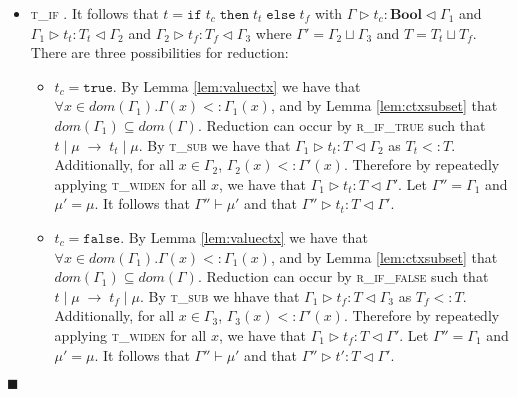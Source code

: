 \documentclass[preprint]{sigplanconf}
\newcommand{\lemref}[1]{Lemma \ref{#1}}
\newcommand{\rmethc}{\textsc{r\_meth\_call} }
\newcommand{\riftrue}{\textsc{r\_if\_true} }
\newcommand{\riffalse}{\textsc{r\_if\_false} }
\newcommand{\tif}{\textsc{t\_if} }
\newcommand{\tsub}{\textsc{t\_sub} }
\newcommand{\twiden}{\textsc{t\_widen} }
\newcommand{\typerule}[4]{#1 \triangleright #2 : #3 \triangleleft #4}
\newcommand{\oprule}[4]{#1 \mid #2\;\longrightarrow\;#3 \mid #4}
\newcommand{\truev}{\mathtt{true}}
\newcommand{\falsev}{\mathtt{false}}
\newcommand{\boolt}{\mathbf{Bool}}
\newcommand{\ift}[3]{\mathtt{if} \; #1 \; \mathtt{then} \; #2 \; \mathtt{else} \; #3}
\newcommand{\qed}{$\blacksquare$}
\newenvironment{proof}{\vspace{1ex}\noindent{\bf Proof}\hspace{0.5em}}
  {\hfill\qed\vspace{1ex}}
\begin{document}
\begin{proof}
\begin{itemize}
As
$\Gamma \vdash \mu$, we must have $\mu(x) = o'@S_c$ with
$\typerule{\emptyset}{o'@S_c}{O'@S_c}{\emptyset}$ such that
$O'@S_c <: O@\overline{S}$. 

We must have that
$o' = [ S_c \{ m = (v,S_n) ; ... \} ... ]$, where $O'@S_n <: O@\overline{S'}$. 
It follows that $\typerule{\emptyset}{v}{T'}{\emptyset}$
for some $T'$ such that $T' <: T$.

Therefore reduction can occur by \rmethc such that
$\oprule{t}{\mu}{v}{\mu [x \mapsto o@S_n]}$.
Let $\mu' = \mu [ x \mapsto o@S']$.

Let $\Gamma'' = \Gamma'$. By the appropriate value typing rule for $v$, 
it follows that $\typerule{\Gamma''}{v}{T'}{\Gamma'}$.
By application of rule \tsub, it follows that
$\typerule{\Gamma''}{v}{T}{\Gamma'}$.
Additionally, it follows that
$\Gamma'' \vdash \mu'$, as $O'@S_n <: O@\overline{S'}$.

\item \tif. It follows that $t = \ift{t_c}{t_t}{t_f}$ with
$\typerule{\Gamma}{t_c}{\boolt}{\Gamma_1}$ and
$\typerule{\Gamma_1}{t_t}{T_t}{\Gamma_2}$ and
$\typerule{\Gamma_2}{t_f}{T_f}{\Gamma_3}$ where
$\Gamma' = \Gamma_2 \sqcup \Gamma_3$ and $T = T_t \sqcup T_f$. There are
three possibilities for reduction:

  \begin{itemize}
  \item $t_c = \truev$. By \lemref{lem:valuectx} we have that
  $\forall x \in dom(\Gamma_1) . \Gamma(x) <: \Gamma_1(x)$, and
  by \lemref{lem:ctxsubset} that $dom(\Gamma_1) \subseteq dom(\Gamma)$. 
  Reduction can occur by \riftrue such that
  $\oprule{t}{\mu}{t_t}{\mu}$. By \tsub we have that
  $\typerule{\Gamma_1}{t_t}{T}{\Gamma_2}$ as $T_t <: T$. Additionally, for
  all $x \in \Gamma_2$, $\Gamma_2(x) <: \Gamma'(x)$. Therefore by
  repeatedly applying \twiden for all $x$, we have that
  $\typerule{\Gamma_1}{t_t}{T}{\Gamma'}$.
  Let $\Gamma'' = \Gamma_1$ and $\mu' = \mu$.
  It follows that $\Gamma'' \vdash \mu'$
  and that $\typerule{\Gamma''}{t_t}{T}{\Gamma'}$.

  \item $t_c = \falsev$. By \lemref{lem:valuectx} we have that
  $\forall x \in dom(\Gamma_1) . \Gamma(x) <: \Gamma_1(x)$, and
  by \lemref{lem:ctxsubset} that $dom(\Gamma_1) \subseteq dom(\Gamma)$.
  Reduction can occur by \riffalse such that
  $\oprule{t}{\mu}{t_f}{\mu}$. By \tsub we hhave that
  $\typerule{\Gamma_1}{t_f}{T}{\Gamma_3}$ as $T_f <: T$. Additionally, for
  all $x \in \Gamma_3$, $\Gamma_3(x) <: \Gamma'(x)$. Therefore by
  repeatedly applying \twiden for all $x$, we have that
  $\typerule{\Gamma_1}{t_f}{T}{\Gamma'}$. Let $\Gamma'' = \Gamma_1$
  and $\mu' = \mu$. It follows that $\Gamma'' \vdash \mu'$ and that
  $\typerule{\Gamma''}{t'}{T}{\Gamma'}$.


\end{itemize}
\end{itemize}
\end{proof}
\end{document}
